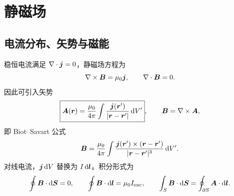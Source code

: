 \section{静磁场}

\subsection{电流分布、矢势与磁能}

稳恒电流满足 $\nabla\cdot\bm{j}=0$，静磁场方程为
\[
 \nabla\times\bm{B}=\mu_0\bm{j},
 \qquad \nabla\cdot\bm{B}=0.
\]
因此可引入矢势
\[
 \boxed{\bm{A}(\bm{r})=\frac{\mu_0}{4\pi}
 \int\frac{\bm{j}(\bm{r}')}{|\bm{r}-\bm{r}'|}\mathop{}\!\mathrm d V'},
 \qquad \bm{B}=\nabla\times\bm{A},
\]
即 Biot--Savart 公式
\[
 \bm{B}=\frac{\mu_0}{4\pi}\int
 \frac{\bm{j}(\bm{r}')\times(\bm{r}-\bm{r}')}
 {|\bm{r}-\bm{r}'|^3}\mathop{}\!\mathrm d V'.
\]
对线电流，$\bm{j}\mathop{}\!\mathrm d V$ 替换为 $I\mathop{}\!\mathrm d\bm{l}$。积分形式为
\[
 \oint\bm{B}\cdot\mathop{}\!\mathrm d\bm{S}=0,
 \qquad \oint\bm{B}\cdot\mathop{}\!\mathrm d\bm{l}=\mu_0I_{\rm enc},
 \qquad \int_S\bm{B}\cdot\mathop{}\!\mathrm d\bm{S}=\oint_{\partial S}\bm{A}\cdot\mathop{}\!\mathrm d\bm{l}.
\]


